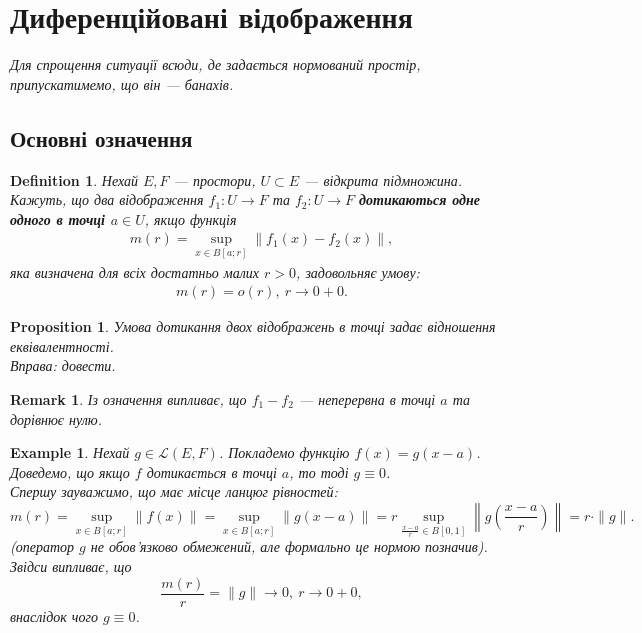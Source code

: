 \documentclass[a4paper, 10pt]{article}
\theoremstyle{theoremdd}
\theoremstyle{theoremdd}
\newtheorem{definition}[theorem]{Definition}
\theoremstyle{theoremdd}
\theoremstyle{theoremdd}
\newtheorem{example}[theorem]{Example}
\theoremstyle{theoremdd}
\newtheorem{proposition}[theorem]{Proposition}
\theoremstyle{theoremdd}
\newtheorem{remark}[theorem]{Remark}
\theoremstyle{theoremdd}
\theoremstyle{theoremdd}
\begin{document}
\section{Диференційовані відображення}
\textit{Для спрощення ситуації всюди, де задається нормований простір, припускатимемо, що він --- банахів.}

\subsection{Основні означення}
\begin{definition}
Нехай $E,F$ --- простори, $U \subset E$ --- відкрита підмножина.\\
Кажуть, що два відображення $f_1 \colon U \to F$ та $f_2 \colon U \to F$ \textbf{дотикаються одне одного в точці $a \in U$}, якщо функція
\begin{align*}
m(r) = \sup_{x \in B[a;r]} \| f_1(x) - f_2(x) \|,
\end{align*}
яка визначена для всіх достатньо малих $r>0$, задовольняє умову:
\begin{align*}
m(r) = o(r),\ r \to 0+0.
\end{align*}
\end{definition}

\begin{proposition}
Умова дотикання двох відображень в точці задає відношення еквівалентності.\\
\textit{Вправа: довести.}
\end{proposition}

\begin{remark}
Із означення випливає, що $f_1 - f_2$ --- неперервна в точці $a$ та дорівнює нулю.
\end{remark}

\begin{example}
\label{tangent_at_zero_then_zero_operator}
Нехай $g \in \mathcal{L}(E,F)$. Покладемо функцію $f(x) = g(x-a)$. Доведемо, що якщо $f$ дотикається в точці $a$, то тоді $g \equiv 0$.
\bigskip \\
Спершу зауважимо, що має місце ланцюг рівностей:
\[
m(r) = \sup_{x \in B[a;r]} \|f(x)\| = \sup_{x \in B[a;r]} \|g(x-a)\| = r \sup_{\frac{x-a}{r} \in B[0,1]} \left\| g\left( \dfrac{x-a}{r} \right) \right\| = r \cdot \|g\|.
\]
(\textit{оператор $g$ не обов'язково обмежений, але формально це нормою позначив}). Звідси випливає, що
\[
\dfrac{m(r)}{r} = \|g\| \to 0,\ r \to 0+0,
\]
внаслідок чого $g \equiv 0$.
\end{example}
\end{document}
